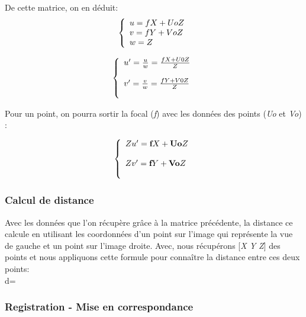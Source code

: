 \documentclass[12pt, french]{report}
\begin{document}
De cette matrice, on en déduit:\\
$$\left\{ 
    \begin{array}{l}
        u=fX+UoZ\\
        v=fY+VoZ\\
        w=Z\\
    \end{array} \\
\right. $$

$$\left\{ 
    \begin{array}{ll}
        u'=\frac{u}{w}=\frac{fX+U0Z}{Z}\\ \\
        v'=\frac{v}{w}=\frac{fY+V0Z}{Z} \\ \\
    \end{array} \\
\right. $$


Pour un point, on pourra sortir la focal (\textit{f}) avec les données des points (\textit{Uo} et \textit{Vo}) :

$$\left\{ 
    \begin{array}{ll}
        Zu'=\textbf{f}X+\textbf{Uo}Z\\ \\
        Zv'=\textbf{f}Y+\textbf{Vo}Z \\ \\
    \end{array} \\
\right. $$

\subsubsection{Calcul de distance}

Avec les données que l'on récupère grâce à la matrice précédente, la distance ce calcule en utilisant les coordonnées d'un point sur l'image qui représente la vue de gauche et un point sur l'image droite. Avec, nous récupérons  [\textit{X Y Z}] des points et nous appliquons cette formule pour connaître la distance entre ces deux points:\\

\hspace{4cm} d=

\subsubsection{Registration - Mise en correspondance}
\end{document}
